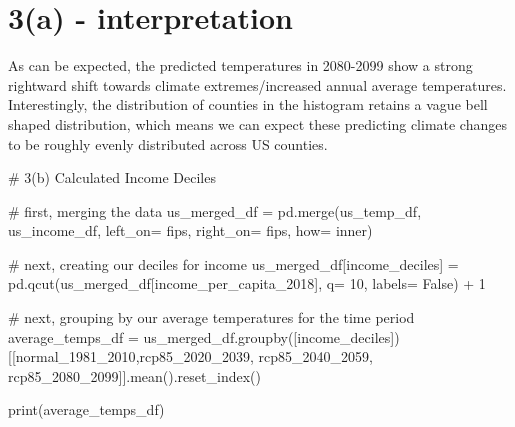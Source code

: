\documentclass[
  letterpaper,
  DIV=11,
  numbers=noendperiod]{scrartcl}
\newenvironment{Shaded}{\begin{snugshade}}{\end{snugshade}}
\newcommand{\BuiltInTok}[1]{\textcolor[rgb]{0.00,0.23,0.31}{#1}}
\newcommand{\CommentTok}[1]{\textcolor[rgb]{0.37,0.37,0.37}{#1}}
\newcommand{\DecValTok}[1]{\textcolor[rgb]{0.68,0.00,0.00}{#1}}
\newcommand{\NormalTok}[1]{\textcolor[rgb]{0.00,0.23,0.31}{#1}}
\newcommand{\OperatorTok}[1]{\textcolor[rgb]{0.37,0.37,0.37}{#1}}
\newcommand{\StringTok}[1]{\textcolor[rgb]{0.13,0.47,0.30}{#1}}
\newcommand{\VariableTok}[1]{\textcolor[rgb]{0.07,0.07,0.07}{#1}}
\begin{document}
\section{3(a) - interpretation}\label{a---interpretation}

As can be expected, the predicted temperatures in 2080-2099 show a
strong rightward shift towards climate extremes/increased annual average
temperatures. Interestingly, the distribution of counties in the
histogram retains a vague bell shaped distribution, which means we can
expect these predicting climate changes to be roughly evenly distributed
across US counties.

\begin{Shaded}
\begin{Highlighting}[]
\CommentTok{\# 3(b) Calculated Income Deciles}

\CommentTok{\# first, merging the data}
\NormalTok{us\_merged\_df }\OperatorTok{=}\NormalTok{ pd.merge(us\_temp\_df, us\_income\_df, left\_on}\OperatorTok{=} \StringTok{\textquotesingle{}fips\textquotesingle{}}\NormalTok{, right\_on}\OperatorTok{=} \StringTok{\textquotesingle{}fips\textquotesingle{}}\NormalTok{, how}\OperatorTok{=} \StringTok{\textquotesingle{}inner\textquotesingle{}}\NormalTok{)}

\CommentTok{\# next, creating our deciles for income}
\NormalTok{us\_merged\_df[}\StringTok{\textquotesingle{}income\_deciles\textquotesingle{}}\NormalTok{] }\OperatorTok{=}\NormalTok{ pd.qcut(us\_merged\_df[}\StringTok{\textquotesingle{}income\_per\_capita\_2018\textquotesingle{}}\NormalTok{], q}\OperatorTok{=} \DecValTok{10}\NormalTok{, labels}\OperatorTok{=} \VariableTok{False}\NormalTok{) }\OperatorTok{+} \DecValTok{1}

\CommentTok{\# next, grouping by our average temperatures for the time period}
\NormalTok{average\_temps\_df }\OperatorTok{=}\NormalTok{ us\_merged\_df.groupby([}\StringTok{\textquotesingle{}income\_deciles\textquotesingle{}}\NormalTok{])[[}\StringTok{\textquotesingle{}normal\_1981\_2010\textquotesingle{}}\NormalTok{,}\StringTok{\textquotesingle{}rcp85\_2020\_2039\textquotesingle{}}\NormalTok{, }\StringTok{\textquotesingle{}rcp85\_2040\_2059\textquotesingle{}}\NormalTok{, }\StringTok{\textquotesingle{}rcp85\_2080\_2099\textquotesingle{}}\NormalTok{]].mean().reset\_index()}

\BuiltInTok{print}\NormalTok{(average\_temps\_df)}
\end{Highlighting}
\end{Shaded}
\end{document}
